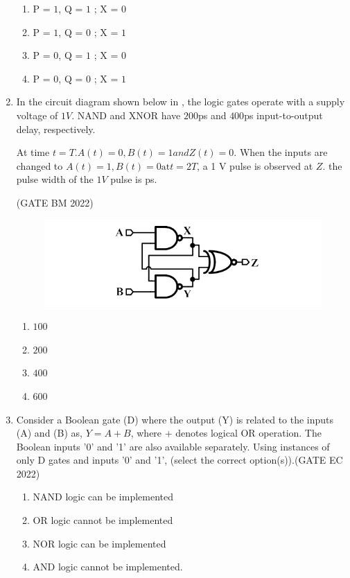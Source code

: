 \begin{enumerate}[label=\arabic*.,ref=\theenumi]
		\begin{enumerate}[label=(\Alph*)]
		\item P = $1$, Q = $1$ ; X = $0$
		\item P = $1$, Q = $0$ ; X = $1$
		\item P = $0$, Q = $1$ ; X = $0$
		\item P = $0$, Q = $0$ ; X = $1$
	\end{enumerate}

\item In the circuit diagram shown below
in , the logic gates operate with a supply voltage of $1 V$. NAND and XNOR have $200$ps and $400$ps input-to-output delay, respectively.

At time $t=T.A(t)=0,B(t)=1 and Z(t)=0.$ When the inputs are changed to $A(t)=1,B(t)=0 \text{at} t=2T$, a 1 V pulse is observed at $Z$. the pulse width of the $1 V$ pulse is  ps.


\hfill{(GATE BM 2022)}

\begin{figure}[!ht]
\centering
\includegraphics[width=\columnwidth]{figs/bm2022.png}
\caption{}
\label{fig:GATE Digram}
\end{figure}

\begin{enumerate}
\item $100$
\item $200$
\item $400$
\item $600$
\end {enumerate}

\item 
Consider a Boolean gate (D) where the output (Y) is related to the inputs (A) and (B) as, $Y = A + B$, where + denotes logical OR operation. The Boolean inputs '0' and '1' are also available separately. Using instances of only D gates and inputs '0' and '1', (select the correct option(s)).\hfill{(GATE EC 2022)}

\begin{enumerate}
\item  NAND logic can be implemented
\item  OR logic cannot be implemented
\item  NOR logic can be implemented
\item  AND logic cannot be implemented.
\end{enumerate}


\end{enumerate}
